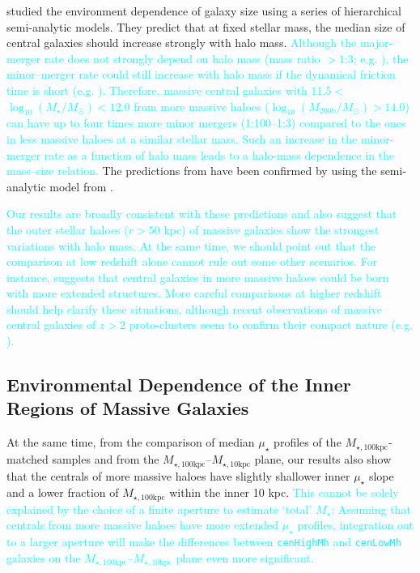 \documentclass[a4paper,fleqn,usenatbib]{mnras}
\def\rbcg{\texttt{cenHighMh}}
\def\nbcg{\texttt{cenLowMh}}
\def\mstar{{$M_{\star}$}}
\def\logms{{$\log_{10} (M_{\star}/M_{\odot})$}}
\def\logmh{{$\log_{10} (M_{\mathrm{200b}}/M_{\odot})$}}
\def\minn{{$M_{\star,10\mathrm{kpc}}$}}
\def\mtot{{$M_{\star,100\mathrm{kpc}}$}}
\def\mden{{$\mu_{\star}$}}
\newcommand{\song}[1]{\textcolor{cyan}{#1}}
\begin{document}
    \citet{Shankar2014} studied the environment dependence of galaxy size using 
    a series of hierarchical semi-analytic models. 
    They predict that at fixed stellar mass, the median size of central galaxies 
    should increase strongly with halo mass. 
    \song{
    Although the major-merger rate does not strongly depend on halo mass 
    (mass ratio $>1$:3; e.g. \citealt{Hirschmann2013, Shankar2015}), the minor--merger 
    rate could still increase with halo mass if the dynamical friction time 
    is short (e.g. \citealt{Newman2012}). 
    Therefore, massive central galaxies with $11.5 <$\logms{}$<12.0$ from more massive 
    haloes (\logmh{}$>14.0$) can have up to four times more minor mergers (1:100--1:3)
    compared to the ones in less massive haloes at a similar stellar mass. 
    Such an increase in the minor-merger rate as a function of halo mass leads to a 
    halo-mass dependence in the mass--size relation. 
    }
    The predictions from \citet{Shankar2014} have been confirmed by \citet{Yoon2017} 
    using the semi-analytic model from \citet{Guo2011}.  
    
    \song{
    Our results are broadly consistent with these predictions and also suggest that 
    the outer stellar haloes ($r>50$ kpc) of massive galaxies show the strongest 
    variations with halo mass. 
    At the same time, we should point out that the comparison at low redshift alone 
    cannot rule out some other scenarios.  
    For instance, \citet{Buchan2016} suggests that central galaxies in more massive 
    haloes could be born with more extended structures. 
    More careful comparisons at higher redshift should help clarify these situations,
    although recent observations of massive central galaxies of $z>2$ proto-clusters 
    seem to confirm their compact nature (e.g. \citealt{Kubo2017}).
    }
   
\subsection{Environmental Dependence of the Inner Regions of Massive Galaxies}
    
    At the same time, from the comparison of median \mden{} profiles of the 
    \mtot{}-matched samples and from the \mtot{}--\minn{} plane, our results also 
    show that the centrals of more massive haloes have slightly shallower inner 
    \mden{} slope and a lower fraction of \mtot{} within the inner 10 kpc.
    \song{
    This cannot be solely explained by the choice of a finite aperture to 
    estimate `total' \mstar{}: Assuming that centrals from more massive haloes 
    have more extended \mden{} profiles, integration out to a larger aperture will 
    make the differences between \rbcg{} and \nbcg{} galaxies on the \mtot{}--\minn{} 
    plane even more significant.
    }
    
\end{document}
